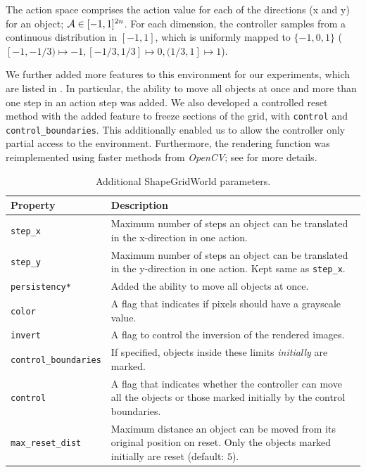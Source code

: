 The action space comprises the action value for each of the directions (x and y) for an object; \(\mathcal{A} \in [-1, 1]^{2 n}\).
For each dimension, the controller samples from a continuous distribution in \([-1, 1]\), which is uniformly mapped to \(\{-1, 0, 1\}\) (\([-1, -1/3) \mapsto -1, [-1/3, 1/3] \mapsto 0, (1/3, 1] \mapsto 1\)).

We further added more features to this environment for our experiments, which are listed in .
In particular, the ability to move all objects at once and more than one step in an action step was added.
We also developed a controlled reset method with the added feature to freeze sections of the grid, with \texttt{control} and \texttt{control\_boundaries}.
This additionally enabled us to allow the controller only partial access to the environment.
Furthermore, the rendering function was reimplemented using faster methods from \emph{OpenCV}; see  for more details.

\begin{table}[H]
    \centering
    \begin{tabularx}{\textwidth}{C{3.9cm} L}
        \hline
        Property & Description\\
        \hline
        \texttt{step\_x} & Maximum number of steps an object can be translated in the x-direction in one action.\\
        \texttt{step\_y} & Maximum number of steps an object can be translated in the y-direction in one action. Kept same as \texttt{step\_x}.\\
        \texttt{persistency*} & Added the ability to move all objects at once.\\
        \texttt{color} & A flag that indicates if pixels should have a grayscale value. \\
        \texttt{invert} & A flag to control the inversion of the rendered images. \\
        \texttt{control\_boundaries} & If specified, objects inside these limits \emph{initially} are marked.\\
        \texttt{control} & A flag that indicates whether the controller can move all the objects or those marked initially by the control boundaries.\\
        \texttt{max\_reset\_dist} & Maximum distance an object can be moved from its original position on reset. Only the objects marked initially are reset (default: \(5\)).\\
        \hline
    \end{tabularx}
    \caption{Additional ShapeGridWorld parameters.}
    \label{tab:additional-sgw-params}
\end{table}

